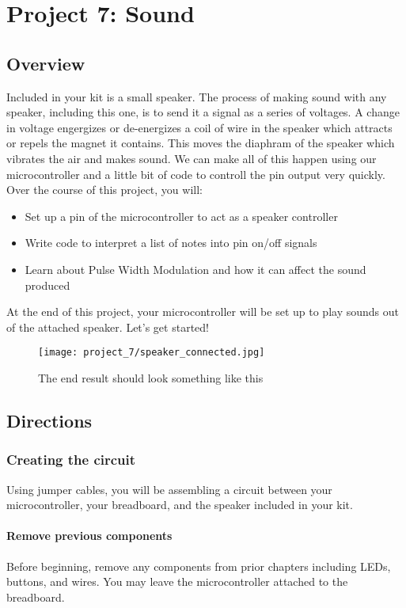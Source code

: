 \chapter{Project 7: Sound}

\section{Overview}
Included in your kit is a small speaker. The process of making sound with any speaker,
including this one, is to send it a signal as a series of voltages. A change in voltage
engergizes or de-energizes a coil of wire in the speaker which attracts or repels the
magnet it contains. This moves the diaphram of the speaker which vibrates the air and
makes sound. We can make all of this happen using our microcontroller and a little bit
of code to controll the pin output very quickly. Over the course of this project, you will:
\begin{itemize}
    \item Set up a pin of the microcontroller to act as a speaker controller
    \item Write code to interpret a list of notes into pin on/off signals
    \item Learn about Pulse Width Modulation and how it can affect the sound produced
\end{itemize}
At the end of this project, your microcontroller will be set up to play sounds out of
the attached speaker. Let's get started!
\begin{figure}[H]
\centering
    \texttt{[image: project\_7/speaker\_connected.jpg]}
    \caption{The end result should look something like this}
\end{figure}

\pagebreak

\section{Directions}

\subsection{Creating the circuit}
Using jumper cables, you will be assembling a circuit between your microcontroller, your breadboard,
and the speaker included in your kit.

\subsubsection{Remove previous components}
Before beginning, remove any components from prior chapters including LEDs, buttons, and wires. You may leave the
microcontroller attached to the breadboard.


